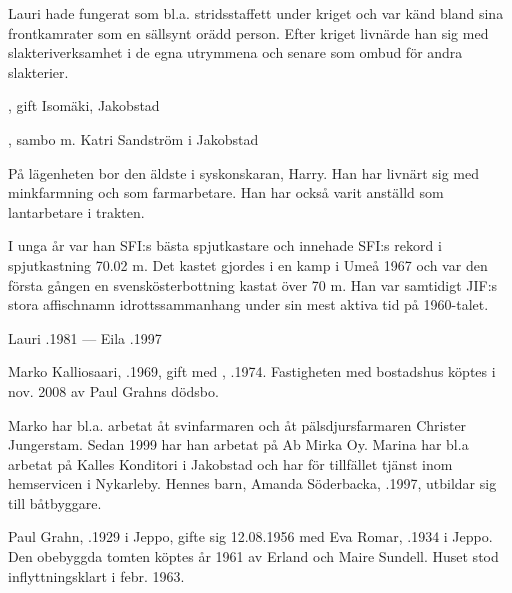 Lauri hade fungerat som bl.a. stridsstaffett under kriget och var känd bland sina frontkamrater som en sällsynt orädd person. Efter kriget livnärde han sig med slakteriverksamhet i de egna utrymmena och senare som ombud för andra slakterier.
\begin{jhchildren}
  \item {}
  \item {}, gift Isomäki, Jakobstad
  \item {}, sambo m. Katri Sandström i Jakobstad
\end{jhchildren}

På lägenheten bor den äldste i syskonskaran, Harry. Han har livnärt sig med minkfarmning och som farmarbetare. Han har också varit anställd som lantarbetare i trakten.

I unga år var han SFI:s bästa spjutkastare och innehade SFI:s rekord i spjutkastning 70.02 m. Det kastet gjordes i en kamp i Umeå 1967 och var den första gången en svenskösterbottning kastat över 70 m. Han var samtidigt JIF:s stora affischnamn idrottssammanhang under sin mest aktiva tid på 1960-talet.

Lauri .1981  ---  Eila .1997






Marko Kalliosaari, .1969, gift med , .1974. Fastigheten med bostadshus köptes i nov. 2008 av Paul Grahns dödsbo.

Marko har bl.a. arbetat åt svinfarmaren  och åt pälsdjursfarmaren Christer Jungerstam. Sedan 1999 har han arbetat på Ab Mirka Oy. Marina har bl.a arbetat på Kalles Konditori i Jakobstad  och har för tillfället tjänst inom hemservicen i Nykarleby. Hennes barn, Amanda Söderbacka, .1997, utbildar sig till båtbyggare.


Paul Grahn, .1929 i Jeppo, gifte sig 12.08.1956 med Eva Romar, .1934 i Jeppo. Den obebyggda tomten köptes år 1961 av Erland och Maire Sundell. Huset stod inflyttningsklart i febr. 1963.


